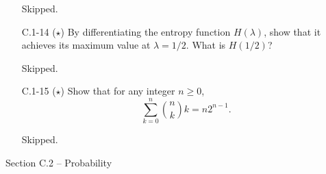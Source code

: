 \documentclass{report}
\makeatletter
\renewenvironment{framed}{%
 \def\FrameCommand##1{\hskip\@totalleftmargin
 \fboxsep=\FrameSep\fbox{##1}}%
 \MakeFramed {\advance\hsize-\width
   \@totalleftmargin\z@ \linewidth\hsize
   \@setminipage}}%
 {\par\unskip\endMakeFramed}
\makeatother
\begin{document}
\begin{enumerate}
\begin{framed}
Skipped.
\end{framed}

\item[C.1{-}14] {($\star$) By differentiating the entropy function $H(\lambda)$,
show that it achieves its maximum value at $\lambda = 1/2$. What is $H(1/2)$?}

\begin{framed}
Skipped.
\end{framed}

\item[C.1{-}15] {($\star$) Show that for any integer $n \ge 0$,
\[
  \sum_{k = 0}^{n} \binom{n}{k} k = n 2^{n - 1}.
\]
}

\begin{framed}
Skipped.
\end{framed}

\end{enumerate}

\newpage

{\large Section C.2 {--} Probability}
\end{document}
